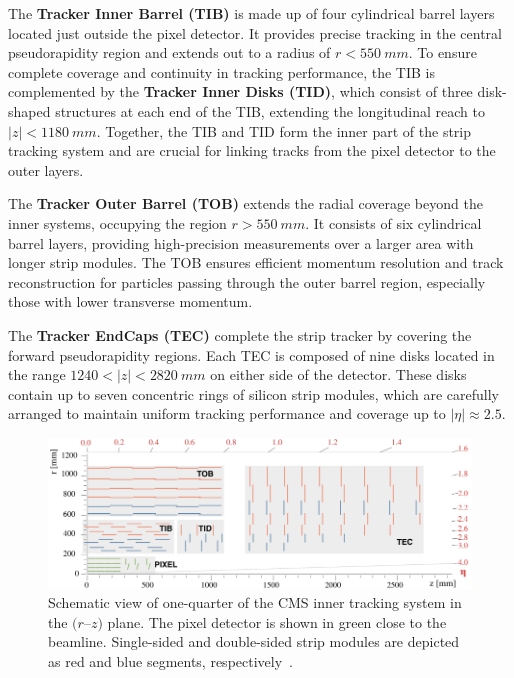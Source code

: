 The \textbf{Tracker Inner Barrel (TIB)} is made up of four cylindrical barrel layers located just outside the pixel detector. It provides precise tracking in the central pseudorapidity region and extends out to a radius of $r < 550~\unit{mm}$. To ensure complete coverage and continuity in tracking performance, the TIB is complemented by the \textbf{Tracker Inner Disks (TID)}, which consist of three disk-shaped structures at each end of the TIB, extending the longitudinal reach to $|z| < 1180~\unit{mm}$. Together, the TIB and TID form the inner part of the strip tracking system and are crucial for linking tracks from the pixel detector to the outer layers.

The \textbf{Tracker Outer Barrel (TOB)} extends the radial coverage beyond the inner systems, occupying the region $r > 550~\unit{mm}$. It consists of six cylindrical barrel layers, providing high-precision measurements over a larger area with longer strip modules. The TOB ensures efficient momentum resolution and track reconstruction for particles passing through the outer barrel region, especially those with lower transverse momentum.

The \textbf{Tracker EndCaps (TEC)} complete the strip tracker by covering the forward pseudorapidity regions. Each TEC is composed of nine disks located in the range $1240 < |z| < 2820~\unit{mm}$ on either side of the detector. These disks contain up to seven concentric rings of silicon strip modules, which are carefully arranged to maintain uniform tracking performance and coverage up to $|\eta| \approx 2.5$.

\begin{figure}[h]
\centering
\includegraphics[width=1\textwidth]{Figures/Chapter3/Phase1_Tracker.pdf}
\caption{Schematic view of one-quarter of the CMS inner tracking system in the $(r$--$z)$ plane. The pixel detector is shown in green close to the beamline. Single-sided and double-sided strip modules are depicted as red and blue segments, respectively~\cite{CMS_Detector_Run3}.}
\label{Figure:Chapter3_Tracker_Geometry}
\end{figure}

